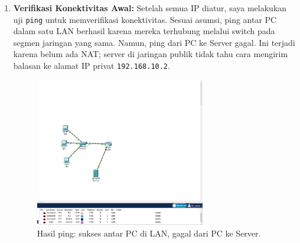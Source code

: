 \begin{enumerate}
    \item \textbf{Verifikasi Konektivitas Awal:} Setelah semua IP diatur, saya melakukan uji \texttt{ping} untuk memverifikasi konektivitas. Sesuai asumsi, ping antar PC dalam satu LAN berhasil karena mereka terhubung melalui switch pada segmen jaringan yang sama. Namun, ping dari PC ke Server gagal. Ini terjadi karena belum ada NAT; server di jaringan publik tidak tahu cara mengirim balasan ke alamat IP privat \texttt{192.168.10.2}.
    \begin{figure}[H]
        \centering
        \includegraphics[width=0.7\textwidth]{img4/CiscPingServerNo.jpeg}
        \caption{Hasil ping: sukses antar PC di LAN, gagal dari PC ke Server.}
    \end{figure}
\end{enumerate}


